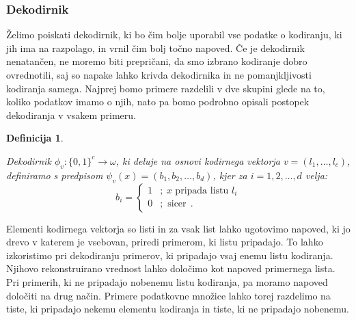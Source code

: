 \documentclass[12pt,a4paper]{article}
\newtheorem{definicija}{Definicija}
\begin{document}

\subsubsection{Dekodirnik}

Želimo poiskati dekodirnik, ki bo čim bolje uporabil vse podatke o kodiranju, ki jih ima na razpolago, in vrnil čim bolj točno napoved.
Če je dekodirnik nenatančen, ne moremo biti prepričani, da smo izbrano kodiranje dobro ovrednotili, saj so napake lahko krivda dekodirnika in ne pomanjkljivosti kodiranja samega.
Najprej bomo primere razdelili v dve skupini glede na to, koliko podatkov imamo o njih, nato pa bomo podrobno opisali postopek dekodiranja v vsakem primeru.

\begin{definicija}
	\label{def-dekodiranje}

		Dekodirnik $\phi_v: \{0,1\}^c \rightarrow \omega$, ki deluje na osnovi kodirnega vektorja $v=(l_1,\ldots, l_c)$, 
		definiramo s predpisom $\psi_v(x) = (b_1, b_2, \ldots, b_d)$, kjer za $i=1,2,\ldots,d$ velja: %
		$$
		b_i = 
		\begin{cases}
		1 &;\ x \text{ pripada listu } l_i \\
		0 &; \text{ sicer}\ \ .
		\end{cases}
		$$
\end{definicija}

Elementi kodirnega vektorja so listi in za vsak list lahko ugotovimo napoved, ki jo drevo v katerem je vsebovan, priredi primerom, ki listu pripadajo.
To lahko izkoristimo pri dekodiranju primerov, ki pripadajo vsaj enemu listu kodiranja. 
Njihovo rekonstruirano vrednost lahko določimo kot napoved primernega lista.
Pri primerih, ki ne pripadajo nobenemu listu kodiranja, pa moramo napoved določiti na drug način.
Primere podatkovne množice lahko torej razdelimo na tiste, ki pripadajo nekemu elementu kodiranja in tiste, ki ne pripadajo nobenemu.
\end{document}
